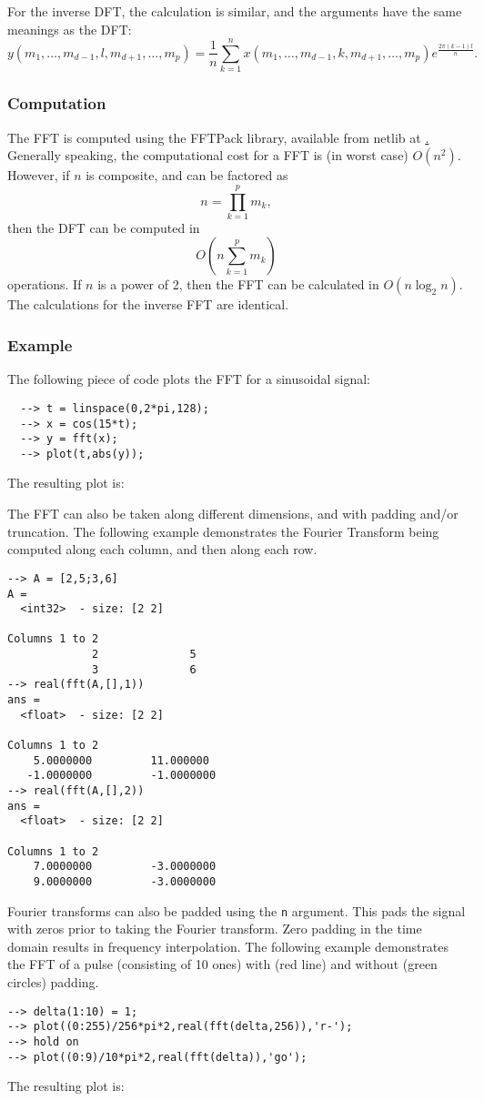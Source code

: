 For the inverse DFT, the calculation is similar, and the arguments
have the same meanings as the DFT:
\[
y(m_1,\ldots,m_{d-1},l,m_{d+1},\ldots,m_{p}) = 
\frac{1}{n} \sum_{k=1}^{n} x(m_1,\ldots,m_{d-1},k,m_{d+1},\ldots,m_{p})
e^{\frac{2\pi(k-1)l}{n}}.
\]
 \subsubsection{Computation}
 The FFT is computed using the FFTPack library, available from 
 netlib at \href{http://www.netlib.org}.  Generally speaking, the 
 computational cost for a FFT is (in worst case) $O(n^2)$.
 However, if $n$ is composite, and can be factored as
 \[
 n = \prod_{k=1}^{p} m_k,
 \]
 then the DFT can be computed in 
 \[
 O(n \sum_{k=1}^{p} m_k)
 \]
 operations.  If $n$ is a power of 2, then the FFT can be
 calculated in $O(n \log_2 n)$.  The calculations for the
 inverse FFT are identical.
 \subsubsection{Example}
 The following piece of code plots the FFT for a sinusoidal signal:
\begin{verbatim}
  --> t = linspace(0,2*pi,128);
  --> x = cos(15*t);
  --> y = fft(x);
  --> plot(t,abs(y));
\end{verbatim}
The resulting plot is:


The FFT can also be taken along different dimensions, and with padding 
and/or truncation.  The following example demonstrates the Fourier
Transform being computed along each column, and then along each row.
\begin{verbatim}
--> A = [2,5;3,6]
A =
  <int32>  - size: [2 2]
  
Columns 1 to 2
             2              5
             3              6
--> real(fft(A,[],1))
ans =
  <float>  - size: [2 2]
  
Columns 1 to 2
    5.0000000         11.000000
   -1.0000000         -1.0000000
--> real(fft(A,[],2))
ans =
  <float>  - size: [2 2]
  
Columns 1 to 2
    7.0000000         -3.0000000
    9.0000000         -3.0000000
\end{verbatim}
Fourier transforms can also be padded using the \verb|n| argument.  This
pads the signal with zeros prior to taking the Fourier transform.  Zero
padding in the time domain results in frequency interpolation.  The
following example demonstrates the FFT of a pulse (consisting of 10 ones)
with (red line) and without (green circles) padding.
\begin{verbatim}
--> delta(1:10) = 1;
--> plot((0:255)/256*pi*2,real(fft(delta,256)),'r-');
--> hold on
--> plot((0:9)/10*pi*2,real(fft(delta)),'go');
\end{verbatim}
The resulting plot is:

